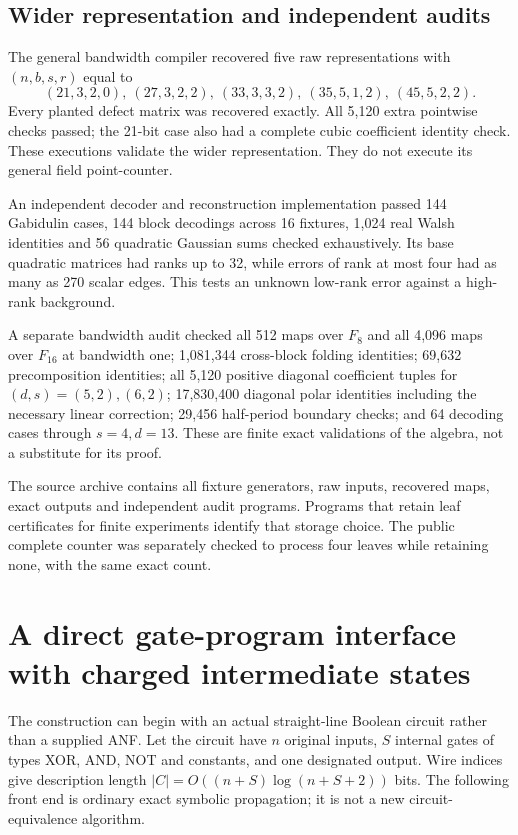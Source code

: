 \documentclass[11pt]{article}
\theoremstyle{remark}\newtheorem{remark}[theorem]{Remark}
\begin{document}
\subsection{Wider representation and independent audits}
The general bandwidth compiler recovered five raw representations with $(n,b,s,r)$ equal to
\[
 (21,3,2,0),\ (27,3,2,2),\ (33,3,3,2),\
 (35,5,1,2),\ (45,5,2,2).
\]
Every planted defect matrix was recovered exactly. All 5,120 extra pointwise checks passed; the 21-bit case also had a complete cubic coefficient identity check. These executions validate the wider representation. They do not execute its general field point-counter.

An independent decoder and reconstruction implementation passed 144 Gabidulin cases, 144 block decodings across 16 fixtures, 1,024 real Walsh identities and 56 quadratic Gaussian sums checked exhaustively. Its base quadratic matrices had ranks up to 32, while errors of rank at most four had as many as 270 scalar edges. This tests an unknown low-rank error against a high-rank background.

A separate bandwidth audit checked all 512 maps over $F_8$ and all 4,096 maps over $F_{16}$ at bandwidth one; 1,081,344 cross-block folding identities; 69,632 precomposition identities; all 5,120 positive diagonal coefficient tuples for $(d,s)=(5,2),(6,2)$; 17,830,400 diagonal polar identities including the necessary linear correction; 29,456 half-period boundary checks; and 64 decoding cases through $s=4,d=13$. These are finite exact validations of the algebra, not a substitute for its proof.

The source archive contains all fixture generators, raw inputs, recovered maps, exact outputs and independent audit programs. Programs that retain leaf certificates for finite experiments identify that storage choice. The public complete counter was separately checked to process four leaves while retaining none, with the same exact count.

\section{A direct gate-program interface with charged intermediate states}\label{sec:program}
The construction can begin with an actual straight-line Boolean circuit rather than a supplied ANF. Let the circuit have $n$ original inputs, $S$ internal gates of types XOR, AND, NOT and constants, and one designated output. Wire indices give description length $|C|=O((n+S)\log(n+S+2))$ bits. The following front end is ordinary exact symbolic propagation; it is not a new circuit-equivalence algorithm.
\end{document}
